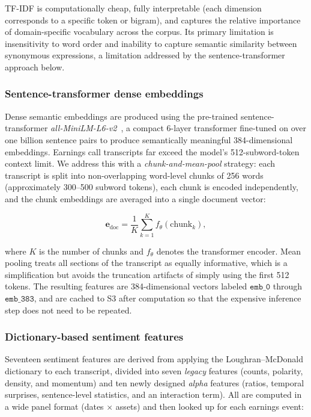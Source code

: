 \documentclass{article}
\begin{document}
TF-IDF is computationally cheap, fully interpretable (each dimension corresponds to a specific token or bigram), and captures the relative importance of domain-specific vocabulary across the corpus. Its primary limitation is insensitivity to word order and inability to capture semantic similarity between synonymous expressions, a limitation addressed by the sentence-transformer approach below.

\subsubsection{Sentence-transformer dense embeddings}

Dense semantic embeddings are produced using the pre-trained sentence-transformer \textit{all-MiniLM-L6-v2}~\cite{reimers2019}, a compact 6-layer transformer fine-tuned on over one billion sentence pairs to produce semantically meaningful 384-dimensional embeddings. Earnings call transcripts far exceed the model's 512-subword-token context limit. We address this with a \textit{chunk-and-mean-pool} strategy: each transcript is split into non-overlapping word-level chunks of 256 words (approximately 300--500 subword tokens), each chunk is encoded independently, and the chunk embeddings are averaged into a single document vector:

\begin{equation}
\mathbf{e}_{\mathrm{doc}}
= \frac{1}{K}\sum_{k=1}^{K} f_\theta(\text{chunk}_k),
\end{equation}

where $K$ is the number of chunks and $f_\theta$ denotes the transformer encoder. Mean pooling treats all sections of the transcript as equally informative, which is a simplification but avoids the truncation artifacts of simply using the first 512 tokens. The resulting features are 384-dimensional vectors labeled $\mathtt{emb\_0}$ through $\mathtt{emb\_383}$, and are cached to S3 after computation so that the expensive inference step does not need to be repeated.

\subsubsection{Dictionary-based sentiment features}

Seventeen sentiment features are derived from applying the Loughran--McDonald dictionary to each transcript, divided into seven \emph{legacy} features (counts, polarity, density, and momentum) and ten newly designed \emph{alpha} features (ratios, temporal surprises, sentence-level statistics, and an interaction term). All are computed in a wide panel format (dates $\times$ assets) and then looked up for each earnings event:
\end{document}
